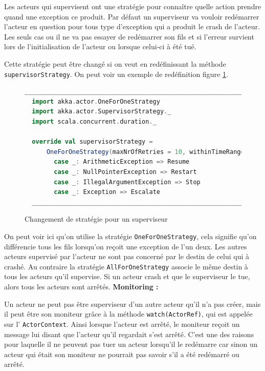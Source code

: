 \documentclass[11pt, a4paper]{article}
\begin{document}
\par Les acteurs qui supervisent ont une stratégie pour connaître  quelle action prendre quand une exception ce produit. Par défaut un superviseur va vouloir redémarrer l'acteur en question pour tous type d'exception qui a produit le crash de l'acteur. Les seuls cas ou il ne va pas essayer de redémarrer son fils et si l'erreur survient lors de l'initialisation de l'acteur ou lorsque celui-ci à été tué.
\par Cette stratégie peut être changé si on veut en redéfinissant la méthode \texttt{supervisorStrategy}. On peut voir un exemple de redéfinition figure \ref{fig3}.

\begin{figure}[ht]
  \begin{lstlisting}[language=scala]
  __________________________________________________________________________
  import akka.actor.OneForOneStrategy
  import akka.actor.SupervisorStrategy._
  import scala.concurrent.duration._

  override val supervisorStrategy =
      OneForOneStrategy(maxNrOfRetries = 10, withinTimeRange = 1 minute) {
        case _: ArithmeticException => Resume
        case _: NullPointerException => Restart
        case _: IllegalArgumentException => Stop
        case _: Exception => Escalate
  __________________________________________________________________________
  \end{lstlisting}
  \caption{Changement de stratégie pour un superviseur \cite{akka}}
  \label{fig3}
\end{figure}
\par On peut voir ici qu'on utilise la stratégie \texttt{OneForOneStrategy}, cela signifie qu'on différencie tous les fils lorsqu'on reçoit une exception de l'un deux. Les autres acteurs supervisé par l'acteur ne sont pas concerné par le destin de celui qui à crashé. Au contraire la stratégie \texttt{AllForOneStrategy} associe le même destin à tous les acteurs qu'il supervise. Si un acteur crash et que le superviseur le tue, alors tous les acteurs sont arrêtés.
\newline
\newline
\textbf{Monitoring :}
\par Un acteur ne peut pas être superviseur d'un autre acteur qu'il n'a pas créer, mais il peut être son moniteur grâce à la méthode \texttt{watch(ActorRef)}, qui est appelée sur l' \texttt{ActorContext}. Ainsi lorsque l'acteur est arrêté, le moniteur reçoit un message lui disant que l'acteur qu'il regardait s'est arrêté. C'est une des raisons pour laquelle il ne peuvent pas tuer un acteur lorsqu'il le redémarre car sinon un acteur qui était son moniteur ne pourrait pas savoir s'il a été redémarré ou arrêté.
\end{document}
